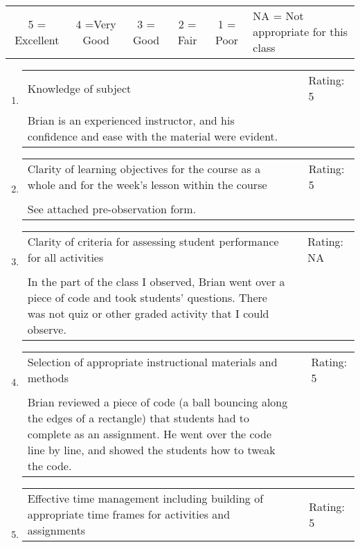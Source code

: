 \documentclass[11pt,dvipsnames]{article}
\begin{document}

{\tabulinesep=1.2mm
	\begin{tabu}{c  c c c c p{4cm} }
		
		5 = Excellent   & 4 =Very Good & 3 = Good & 2 = Fair & 1 = Poor & NA = Not appropriate for this class  \\ 	
	\end{tabu}}
\vskip 0.5cm

\begin{enumerate}[label= {\bf  \arabic*:}]
	\item
	\begin{tabular}[t]{p{} p{3cm} p{2cm} }
		Knowledge of subject & & Rating: 5 \\
		& & \\
		Brian is an experienced instructor, and his confidence and ease with the material were evident. & & \\
	\end{tabular} 
	
	
	\item 	\begin{tabular}[t]{p{}  p{3cm} p{3cm} }
		Clarity of learning objectives for the course as a whole and for the week's lesson within the course & & Rating: 5\\
		&&\\
		See attached pre-observation form. &&\\
	\end{tabular} 
	\item 	\begin{tabular}[t]{p{}  p{3cm} p{3cm} }
		Clarity of criteria for assessing student performance for all activities & & Rating: NA\\
		& & \\
		In the part of the class I observed, Brian went over a piece of code and took students' questions. There was not quiz or other graded activity that I could observe.&& \\
		\end{tabular} 
    \item 	\begin{tabular}[t]{p{}  p{3cm} p{3cm} }
	Selection of appropriate instructional materials and methods & & Rating: 5\\
	& &\\
	Brian reviewed a piece of code (a ball bouncing along the edges of a rectangle) that students had to complete as an assignment. He went over the code line by line, and showed the students how to tweak the code. & &\\
\end{tabular} 
\item 	\begin{tabular}[t]{p{}  p{3cm} p{3cm} }
	Effective time management including building of appropriate
	time frames for activities and assignments & & Rating: 5\\
	

\end{tabular}
\end{enumerate}
\end{document}

